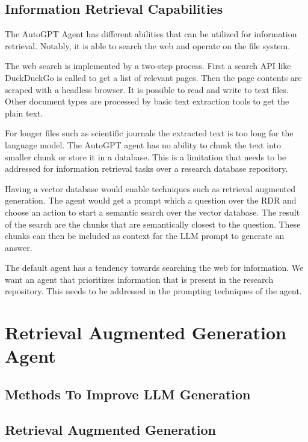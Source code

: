 \documentclass[english, version-2022-01]{uzl-thesis}
\begin{document}
\section{Information Retrieval Capabilities}

The AutoGPT Agent has different abilities that can be utilized for information retrieval.
Notably, it is able to search the web and operate on the file system.

The web search is implemented by a two-step process.
First a search API like DuckDuckGo is called to get a list of relevant pages.
Then the page contents are scraped with a headless browser.
It is possible to read and write to text files.
Other document types are processed by basic text extraction tools to get the plain text.

For longer files such as scientific journals the extracted text is too long for the language model.
The AutoGPT agent has no ability to chunk the text into smaller chunk or store it in a database.
This is a limitation that needs to be addressed for information retrieval tasks over a research database repository.

Having a vector database would enable techniques such as retrieval augmented generation.
The agent would get a prompt which a question over the RDR and choose an action to start a semantic search over the vector database.
The result of the search are the chunks that are semantically closest to the question.
These chunks can then be included as context for the LLM prompt to generate an answer.

The default agent has a tendency towards searching the web for information. We want an agent that prioritizes information that is present in the research repository.
This needs to be addressed in the prompting techniques of the agent.

\chapter{Retrieval Augmented Generation Agent}


\section{Methods To Improve LLM Generation}


\section{Retrieval Augmented Generation}

\end{document}
